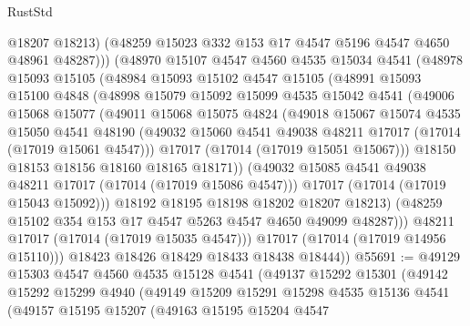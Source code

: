 \begin{lexlean}{RustStd}
\begin{coremodule}
                @18207
                @18213)
              (@48259 @15023 @332 @153 @17 @4547 @5196 @4547 @4650 @48961 @48287)))
          (@48970
            @15107
            @4547
            @4560
            @4535
            @15034
            @4541
            (@48978
              @15093
              @15105
              (@48984
                @15093
                @15102
                @4547
                @15105
                (@48991
                  @15093
                  @15100
                  @4848
                  (@48998
                    @15079
                    @15092
                    @15099
                    @4535
                    @15042
                    @4541
                    (@49006
                      @15068
                      @15077
                      (@49011
                        @15068
                        @15075
                        @4824
                        (@49018
                          @15067
                          @15074
                          @4535
                          @15050
                          @4541
                          @48190
                          (@49032 @15060 @4541 @49038 @48211 @17017 (@17014 (@17019 @15061 @4547)))
                          @17017
                          (@17014 (@17019 @15051 @15067)))
                        @18150
                        @18153
                        @18156
                        @18160
                        @18165
                        @18171))
                    (@49032 @15085 @4541 @49038 @48211 @17017 (@17014 (@17019 @15086 @4547)))
                    @17017
                    (@17014 (@17019 @15043 @15092)))
                  @18192
                  @18195
                  @18198
                  @18202
                  @18207
                  @18213)
                (@48259 @15102 @354 @153 @17 @4547 @5263 @4547 @4650 @49099 @48287)))
            @48211
            @17017
            (@17014 (@17019 @15035 @4547)))
          @17017
          (@17014 (@17019 @14956 @15110)))
        @18423
        @18426
        @18429
        @18433
        @18438
        @18444))
@55691 := @49129
    @15303
    @4547
    @4560
    @4535
    @15128
    @4541
    (@49137
      @15292
      @15301
      (@49142
        @15292
        @15299
        @4940
        (@49149
          @15209
          @15291
          @15298
          @4535
          @15136
          @4541
          (@49157
            @15195
            @15207
            (@49163
              @15195
              @15204
              @4547

\end{coremodule}
\end{lexlean}
